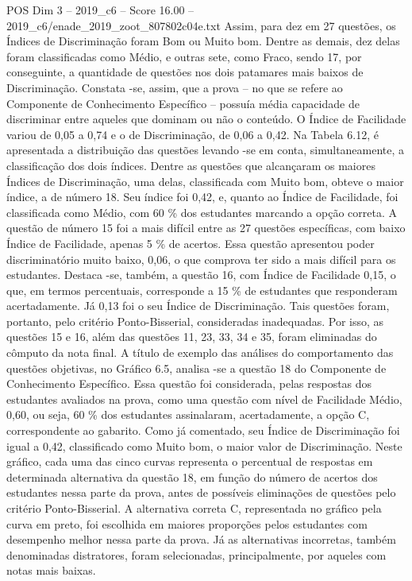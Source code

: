 \begin{textsample}{POS Dim 3 – 2019\_c6 – Score 16.00 – 2019\_c6/enade\_2019\_zoot\_807802c04e.txt}
Assim, para dez em 27 questões, os Índices de Discriminação foram Bom ou Muito bom.
Dentre as demais, dez delas foram classificadas como Médio, e outras sete, como Fraco, sendo 17, por conseguinte, a quantidade de questões nos dois patamares mais baixos de Discriminação.
Constata -se, assim, que a prova – no que se refere ao Componente de Conhecimento Específico – possuía média capacidade de discriminar entre aqueles que dominam ou não o conteúdo.
O Índice de Facilidade variou de 0,05 a 0,74 e o de Discriminação, de 0,06 a 0,42.
Na Tabela 6.12, é apresentada a distribuição das questões levando -se em conta, simultaneamente, a classificação dos dois índices.
Dentre as questões que alcançaram os maiores Índices de Discriminação, uma delas, classificada com Muito bom, obteve o maior índice, a de número 18.
Seu índice foi 0,42, e, quanto ao Índice de Facilidade, foi classificada como Médio, com 60 \% dos estudantes marcando a opção correta.
A questão de número 15 foi a mais difícil entre as 27 questões específicas, com baixo Índice de Facilidade, apenas 5 \% de acertos.
Essa questão apresentou poder discriminatório muito baixo, 0,06, o que comprova ter sido a mais difícil para os estudantes.
Destaca -se, também, a questão 16, com Índice de Facilidade 0,15, o que, em termos percentuais, corresponde a 15 \% de estudantes que responderam acertadamente.
Já 0,13 foi o seu Índice de Discriminação.
Tais questões foram, portanto, pelo critério Ponto-Bisserial, consideradas inadequadas.
Por isso, as questões 15 e 16, além das questões 11, 23, 33, 34 e 35, foram eliminadas do cômputo da nota final.
A título de exemplo das análises do comportamento das questões objetivas, no Gráfico 6.5, analisa -se a questão 18 do Componente de Conhecimento Específico.
Essa questão foi considerada, pelas respostas dos estudantes avaliados na prova, como uma questão com nível de Facilidade Médio, 0,60, ou seja, 60 \% dos estudantes assinalaram, acertadamente, a opção C, correspondente ao gabarito.
Como já comentado, seu Índice de Discriminação foi igual a 0,42, classificado como Muito bom, o maior valor de Discriminação.
Neste gráfico, cada uma das cinco curvas representa o percentual de respostas em determinada alternativa da questão 18, em função do número de acertos dos estudantes nessa parte da prova, antes de possíveis eliminações de questões pelo critério Ponto-Bisserial.
A alternativa correta C, representada no gráfico pela curva em preto, foi escolhida em maiores proporções pelos estudantes com desempenho melhor nessa parte da prova.
Já as alternativas incorretas, também denominadas distratores, foram selecionadas, principalmente, por aqueles com notas mais baixas.

\end{textsample}
